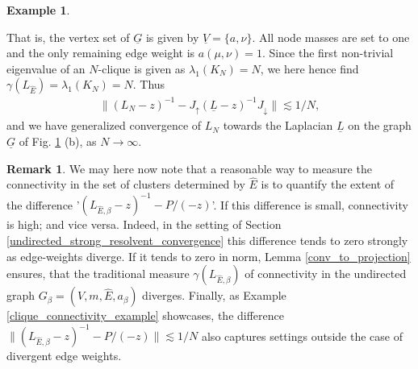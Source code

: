 \documentclass[reqno,12pt,letterpaper]{amsart}
\numberwithin{equation}{section}
\newcommand{\1}{\mathds{1}}
\theoremstyle{definition}
\newtheorem{Rem}[Th]{Remark}
\newtheorem{Ex}[Th]{Example}
\begin{document}
\begin{Ex}
\begin{minipage}[b]{0.5\textwidth}
\begin{tikzpicture}[
	scale=2,
	every node/.style={circle, draw, minimum size=15pt, inner sep=0pt},
	labelnode/.style={draw=none, fill=none, inner sep=1pt}
	]
\end{tikzpicture}
\label{fig:a-k8}
\end{minipage}



\noindent That is, the vertex set of $\underline{G}$ is
 given by $\underline{V} = \{a,\nu\}$. All node masses are set to one and the only remaining edge weight is $a(\mu, \nu) = 1$.
  Since the first non-trivial eigenvalue of an $N$-clique is given as $\lambda_1(K_N) = N$, we here hence find $\gamma(L_{\hat{E}}) = \lambda_1(K_N) = N$. Thus
\begin{align}\label{clique_implosion}
	\|  (L_N - z)^{-1} -     J_\uparrow  (\underline{L} - z)^{-1} J_\downarrow  \| \lesssim 1/N,
\end{align}
\noindent and we have generalized convergence of $L_N$ towards the Laplacian $\underline{L}$ on the graph $\underline{G}$ of Fig. \ref{fig:a-k8} (b),  as $N \rightarrow \infty$.
\end{Ex}




\begin{Rem}
We may here now note that a reasonable way to measure the connectivity in the set of clusters determined by $\hat{E}$ is to quantify the extent of the  difference '$(L_{\hat{E},\beta} -z)^{-1} - P/(-z)$'. If this difference is small, connectivity is high; and vice versa.
 Indeed, in the setting of Section \ref{undirected_strong_resolvent_convergence} this difference tends to zero strongly as edge-weights diverge. If it tends to zero in norm,  Lemma \ref{conv_to_projection} ensures, that  the traditional measure $\gamma(L_{\hat{E},\beta})$ of connectivity in the undirected graph  $G_{\beta} = (V, m, \hat{E}, a_\beta)$ diverges. Finally, as 	Example \ref{clique_connectivity_example} showcases,  the difference $\|(L_{\hat{E},\beta} -z)^{-1} - P/(-z)\| \lesssim 1/N$ also  captures  settings outside the case of divergent edge weights.
\end{Rem}
\end{document}

